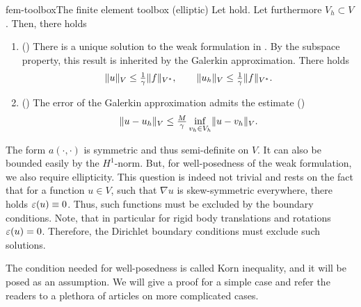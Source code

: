 \begin{Theorem*}{fem-toolbox}{The finite element toolbox (elliptic)}
  Let  hold. Let furthermore
  $V_h\subset V$. Then, there holds
  \begin{enumerate}
  \item () There is a unique solution to
    the weak formulation in
    . By the subspace
    property, this result is inherited by the Galerkin
    approximation. There holds
    \begin{gather}
      \lVert u\rVert_V \le \tfrac1{\gamma} \lVert f\rVert_{V^*},
      \qquad
      \lVert u_h\rVert_V \le \tfrac1{\gamma} \lVert f\rVert_{V^*}.
    \end{gather}
  \item () The error of the Galerkin
    approximation admits the estimate ()
    \begin{gather}
      \lVert u-u_h\rVert_V \le \tfrac{M}{\gamma}\inf_{v_h\in V_h}\lVert u-v_h\rVert_V.
    \end{gather}
  \end{enumerate}
\end{Theorem*}

\begin{intro}
  The form $a(\cdot,\cdot)$ is symmetric and thus semi-definite on $V$. It can
  also be bounded easily by the $H^1$-norm. But, for well-posedness of
  the weak formulation, we also require ellipticity. This question is
  indeed not trivial and rests on the fact that for a function
  $u\in V$, such that $\nabla u$ is skew-symmetric everywhere, there
  holds $\varepsilon(u)\equiv 0$. Thus, such functions must be excluded by
  the boundary conditions. Note, that in particular for rigid body
  translations and rotations $\varepsilon(u) = 0$. Therefore, the Dirichlet
  boundary conditions must exclude such solutions.
  
  The condition needed for well-posedness is called Korn inequality,
  and it will be posed as an assumption. We will give a proof for a
  simple case and refer the readers to a plethora of articles on more
  complicated cases.
\end{intro}


